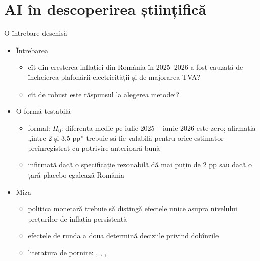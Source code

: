 \section{AI în descoperirea științifică}

\begin{frame}{O întrebare deschisă}
\itemsize{\small}
\begin{itemize}
    \item Întrebarea
    \begin{itemize}
        \item cît din creșterea inflației din România în 2025--2026 a fost cauzată de încheierea plafonării electricității și de majorarea TVA?
        \item cît de robust este răspunsul la alegerea metodei?
    \end{itemize}
    \item O formă testabilă
    \begin{itemize}
        \item formal: $H_0$: diferența medie pe iulie 2025 -- iunie 2026 este zero; afirmația „între 2 și 3,5 pp” trebuie să fie valabilă pentru orice estimator preînregistrat cu potrivire anterioară bună
        \item infirmată dacă o specificație rezonabilă dă mai puțin de 2 pp sau dacă o țară placebo egalează România
    \end{itemize}
    \item Miza
    \begin{itemize}
        \item politica monetară trebuie să distingă efectele unice asupra nivelului prețurilor de inflația persistentă
        \item efectele de runda a doua determină deciziile privind dobînzile
        \item literatura de pornire: , , , 
    \end{itemize}
\end{itemize}
\end{frame}


